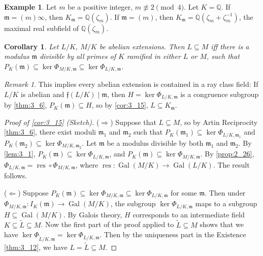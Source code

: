 \documentclass[11pt]{article}
\theoremstyle{definition}
\newtheorem{example}[definition]{Example}
\theoremstyle{plain}
\newtheorem{corollary}[definition]{Corollary}
\theoremstyle{remark}
\newtheorem{remark}[definition]{Remark}
\DeclareMathOperator{\Gal}{Gal}
\DeclareMathOperator{\res}{res}
\newcommand{\QQ}{\mathbb{Q}}
\newcommand{\ff}{\mathfrak{f}}
\newcommand{\fm}{\mathfrak{m}}
\begin{document}
\begin{example}\label{eg:3_14}
    Let $m$ be a positive integer, $m \not\equiv 2 \pmod{4}$. Let $K = \QQ$. If $\fm = (m) \infty$, then $K_\fm = \QQ(\zeta_m)$. If $\fm = (m)$, then $K_\fm = \QQ(\zeta_m + \zeta_m^{-1})$, the maximal real subfield of $\QQ(\zeta_m)$.
\end{example}

\begin{corollary}\label{cor:3_15}
    Let $L/K$, $M/K$ be abelian extensions. Then $L \subseteq M$ iff there is a modulus $\fm$ divisible by all primes of $K$ ramified in either $L$ or $M$, such that $P_K(\fm) \subseteq \ker \Phi_{M/K, \fm} \subseteq \ker \Phi_{L/K, \fm}$.
\end{corollary}

\begin{remark}\label{rem:3_16}
    This implies every abelian extension is contained in a ray class field: If $L/K$ is abelian and $\ff(L/K) \mid \fm$, then $H = \ker \Phi_{L/K, \fm}$ is a congruence subgroup by \autoref{thm:3_6}, $P_K(\fm) \subseteq H$, so by \autoref{cor:3_15}, $L \subseteq K_\fm$.
\end{remark}

\begin{proof}[Proof of \autoref{cor:3_15} (Sketch)]\phantom{}

    ($\Rightarrow$) Suppose that $L \subseteq M$, so by Artin Reciprocity \autoref{thm:3_6}, there exist moduli $\fm_1$ and $\fm_2$ such that $P_K(\fm_1) \subseteq \ker \Phi_{L/K, \fm_1}$ and $P_K(\fm_2) \subseteq \ker \Phi_{M/K, \fm_2}$. Let $\fm$ be a modulus divisible by both $\fm_1$ and $\fm_2$. By \autoref{lem:3_1}, $P_K(\fm) \subseteq \ker \Phi_{L/K,\fm}$, and $P_K(\fm) \subseteq \ker \Phi_{M/K,\fm}$. By \autoref{prop:2_26}, $\Phi_{L/K, \fm} = \res \circ \Phi_{M/K, \fm}$, where $\res : \Gal(M/K) \to \Gal(L/K)$. The result follows.

    ($\Leftarrow$) Suppose $P_K(\fm) \subseteq \ker \Phi_{M/K, \fm} \subseteq \ker \Phi_{L/K, \fm}$ for some $\fm$. Then under $\Phi_{M/K, \fm} : I_K(\fm) \to \Gal(M/K)$, the subgroup $\ker \Phi_{L/K, \fm}$ maps to a subgroup $H \subseteq \Gal(M/K)$. By Galois theory, $H$ corresponds to an intermediate field $K \subseteq \widetilde{L} \subseteq M$. Now the first part of the proof applied to $\widetilde{L} \subseteq M$ shows that we have $\ker \Phi_{\widetilde{L}/K, \fm} = \ker \Phi_{L/K, \fm}$. Then by the uniqueness part in the Existence \autoref{thm:3_12}, we have $L = \widetilde{L} \subseteq M$.
\end{proof}
\end{document}
